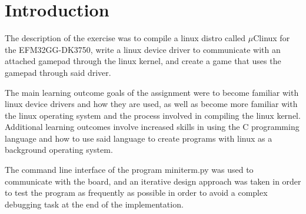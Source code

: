 \section{Introduction}

The description of the exercise was to compile a linux distro called $\mu$Clinux for the EFM32GG-DK3750, write a linux device driver to communicate with an attached gamepad through the linux kernel, and create a game that uses the gamepad through said driver.

The main learning outcome goals of the assignment were to become familiar with linux device drivers and how they are used, as well as become more familiar with the linux operating system and the process involved in compiling the linux kernel. Additional learning outcomes involve increased skills in using the C programming language and how to use said language to create programs with linux as a background operating system.

The command line interface of the program miniterm.py was used to communicate with the board, and an iterative design approach was taken in order to test the program as frequently as possible in order to avoid a complex debugging task at the end of the implementation.